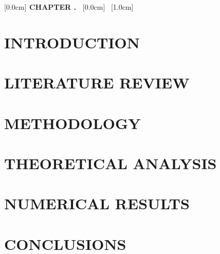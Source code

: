 \documentclass[a4paper,13pt,3p,twoside]{report}
\title{\bf \TITLE}
\author{\AUTHOR}
\theoremstyle{definition}
\begin{document}



\newpage
{}


\newpage
{}


\newpage
{}
\renewcommand*\contentsname{TABLE OF CONTENTS}
[0.0cm]{\bfseries\vspace{0.3cm}}{{\bfseries{\scshape} CHAPTER \thecontentslabel.\ }}{}{{\contentspage}}
[0.0cm]{\vspace{0.3cm}}{\thecontentslabel \ }{}{{\contentspage}}
[1.0cm]{\vspace{0.3cm}}{\thecontentslabel \ }{}{{\contentspage}}
\tableofcontents
\thispagestyle{empty}
\cleardoublepage

\renewcommand{\listfigurename}{LIST OF FIGURES}
{\let\oldnumberline\numberline\renewcommand{\numberline}{Figure~\oldnumberline}\listoffigures}
\newpage

\renewcommand{\listtablename}{LIST OF TABLES}
{\let\oldnumberline\numberline\renewcommand{\numberline}{Table~\oldnumberline}\listoftables}

\glsaddall
\renewcommand*{\acronymname}{LIST OF ABBREVIATIONS}
\renewcommand*{\entryname}{Abbreviation}
\renewcommand*{\descriptionname}{Definition}
\printnoidxglossaries

\renewcommand\appendixname{APPENDIX}
\renewcommand{\figurename}{Figure}
\renewcommand{\tablename}{Table}
\renewcommand{\chaptername}{CHAPTER}

\newpage
{}
\pagestyle{fancy}
\fancyhf{}
\fancyhead[RE, LO]{\leftmark}
\fancyfoot[RE, LO]{\thepage}

\chapter{INTRODUCTION}


\newpage
\chapter{LITERATURE REVIEW}


\newpage
\chapter{METHODOLOGY}


\newpage
\chapter{THEORETICAL ANALYSIS}


\newpage
\chapter{NUMERICAL RESULTS}


\newpage
\chapter{CONCLUSIONS}


\newpage
\printbibliography[title={REFERENCES}]
\end{document}
